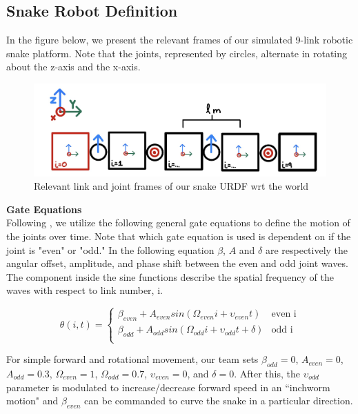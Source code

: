 \documentclass[letterpaper, 10 pt, conference]{ieeeconf}  %
\begin{document}
\subsection{Snake Robot Definition}
In the figure below, we present the relevant frames of our simulated 9-link robotic snake platform. Note that the joints, represented by circles, alternate in rotating about the z-axis and the x-axis. 

\begin{figure}[H]
    \centering
    \includegraphics[width = 1\linewidth]{urdf.jpeg}
    \caption{Relevant link and joint frames of our snake URDF wrt the world}
    \label{fig:urdf}
\end{figure}

\noindent \textbf{Gate Equations}\\
Following \cite{state_est_snake_robots}, we utilize the following general gate equations to define the motion of the joints over time. Note that which gate equation is used is dependent on if the joint is "even" or "odd." In the following equation $\beta$, $A$ and $\delta$ are respectively the angular offset, amplitude, and phase shift between the even and odd joint waves. The component inside the sine functions describe the spatial frequency of the waves with respect to link number, i. 

\begin{equation}
    \theta(i, t) = \begin{cases} 
      \beta_{even} + A_{even}sin(\Omega_{even}i + \upsilon_{even}t)& \text{even i} \\
      \beta_{odd} + A_{odd}sin(\Omega_{odd}i + \upsilon_{odd}t + \delta)& \text{odd i}  \\
   \end{cases}
\end{equation}

For simple forward and rotational movement, our team sets $\beta_{odd}=0$, $A_{even} = 0$, $A_{odd} = 0.3$, $\Omega_{even} = 1$, $\Omega_{odd} = 0.7$, $\upsilon_{even} =0$, and $\delta=0$. After this, the $\upsilon_{odd}$ parameter is modulated to increase/decrease forward speed in an ``inchworm motion" and $\beta_{even}$ can be commanded to curve the snake in a particular direction.  \\
\end{document}
